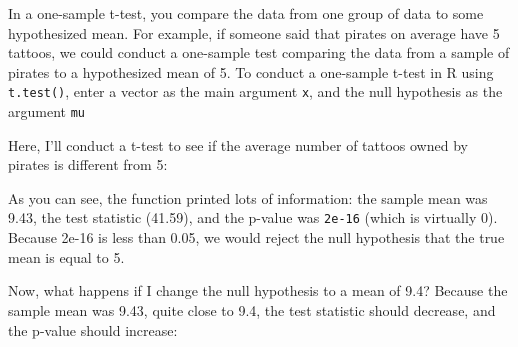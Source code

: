 \documentclass[]{book}
\newenvironment{Shaded}{\begin{snugshade}}{\end{snugshade}}
\newcommand{\KeywordTok}[1]{\textcolor[rgb]{0.13,0.29,0.53}{\textbf{#1}}}
\newcommand{\DataTypeTok}[1]{\textcolor[rgb]{0.13,0.29,0.53}{#1}}
\newcommand{\DecValTok}[1]{\textcolor[rgb]{0.00,0.00,0.81}{#1}}
\newcommand{\FloatTok}[1]{\textcolor[rgb]{0.00,0.00,0.81}{#1}}
\newcommand{\StringTok}[1]{\textcolor[rgb]{0.31,0.60,0.02}{#1}}
\newcommand{\CommentTok}[1]{\textcolor[rgb]{0.56,0.35,0.01}{\textit{#1}}}
\newcommand{\OperatorTok}[1]{\textcolor[rgb]{0.81,0.36,0.00}{\textbf{#1}}}
\newcommand{\NormalTok}[1]{#1}
\theoremstyle{definition}
\theoremstyle{definition}
\theoremstyle{remark}
\begin{document}
In a one-sample t-test, you compare the data from one group of data to
some hypothesized mean. For example, if someone said that pirates on
average have 5 tattoos, we could conduct a one-sample test comparing the
data from a sample of pirates to a hypothesized mean of 5. To conduct a
one-sample t-test in R using \texttt{t.test()}, enter a vector as the
main argument \texttt{x}, and the null hypothesis as the argument
\texttt{mu}

Here, I'll conduct a t-test to see if the average number of tattoos
owned by pirates is different from 5:

\begin{Shaded}
\end{Shaded}

As you can see, the function printed lots of information: the sample
mean was 9.43, the test statistic (41.59), and the p-value was
\texttt{2e-16} (which is virtually 0). Because 2e-16 is less than 0.05,
we would reject the null hypothesis that the true mean is equal to 5.

Now, what happens if I change the null hypothesis to a mean of 9.4?
Because the sample mean was 9.43, quite close to 9.4, the test statistic
should decrease, and the p-value should increase:

\begin{Shaded}
\end{Shaded}
\end{document}
